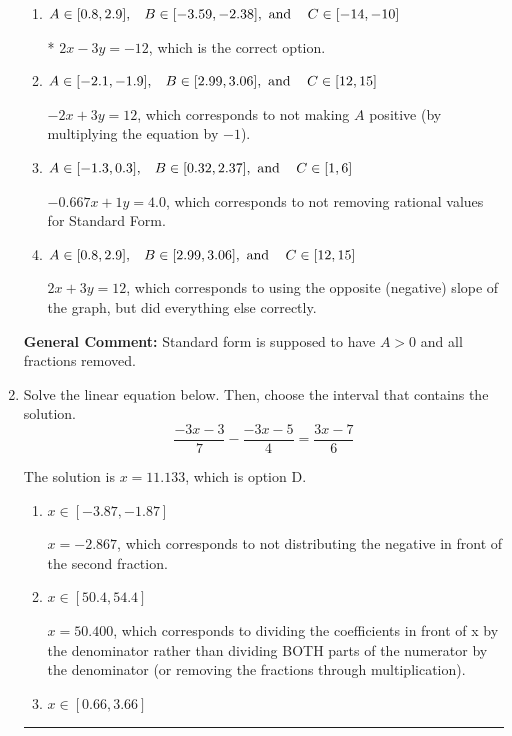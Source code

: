 \documentclass{extbook}[14pt]
\newcommand{\litem}[1]{\item #1

\rule{\textwidth}{0.4pt}}
\begin{document}
\begin{enumerate}
{\begin{enumerate}[label=\Alph*.]
 $-0.667x - 1y = -4.0$, which corresponds to using the opposite (negative) slope of the graph and not removing rational values.
\item \( A \in [0.8, 2.9], \hspace{3mm} B \in [-3.59, -2.38], \text{ and } \hspace{3mm} C \in [-14, -10] \)

* $2x - 3y = -12$, which is the correct option.
\item \( A \in [-2.1, -1.9], \hspace{3mm} B \in [2.99, 3.06], \text{ and } \hspace{3mm} C \in [12, 15] \)

 $-2x + 3y = 12$, which corresponds to not making $A$ positive (by multiplying the equation by $-1$).
\item \( A \in [-1.3, 0.3], \hspace{3mm} B \in [0.32, 2.37], \text{ and } \hspace{3mm} C \in [1, 6] \)

 $-0.667x + 1y = 4.0$, which corresponds to not removing rational values for Standard Form.
\item \( A \in [0.8, 2.9], \hspace{3mm} B \in [2.99, 3.06], \text{ and } \hspace{3mm} C \in [12, 15] \)

 $2x + 3y = 12$, which corresponds to using the opposite (negative) slope of the graph, but did everything else correctly.
\end{enumerate}

\textbf{General Comment:} Standard form is supposed to have $A > 0$ and all fractions removed.
}
\litem{
Solve the linear equation below. Then, choose the interval that contains the solution.
\[ \frac{-3x -3}{7} - \frac{-3x -5}{4} = \frac{3x -7}{6} \]

The solution is \( x = 11.133 \), which is option D.\begin{enumerate}[label=\Alph*.]
\item \( x \in [-3.87, -1.87] \)

 $x = -2.867$, which corresponds to not distributing the negative in front of the second fraction.
\item \( x \in [50.4, 54.4] \)

 $x = 50.400$, which corresponds to dividing the coefficients in front of x by the denominator rather than dividing BOTH parts of the numerator by the denominator (or removing the fractions through multiplication).
\item \( x \in [0.66, 3.66] \)


\end{enumerate}}
\end{enumerate}
\end{document}
